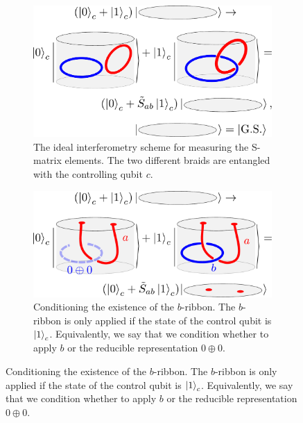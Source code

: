\documentclass[two column]{article}
\begin{document}
\begin{figure}
\centering

\begin{subfigure}{0.47\textwidth}
    \includegraphics[width = \linewidth]{Figures/intef_example.pdf}
    \caption{The ideal interferometry scheme for measuring the S-matrix elements. The two different braids are entangled with the controlling qubit $c$.}
    \label{fig:intef_example}
\end{subfigure}\hfill
\begin{subfigure}{0.47\textwidth}
    \includegraphics[width=\linewidth]{Figures/intefEx.pdf}
    \caption{Conditioning the existence of the $b$-ribbon. The $b$-ribbon is only applied if the state of the control qubit is $\ket{1}_c$. Equivalently, we say that we condition whether to apply $b$ or the reducible representation $0\oplus 0$.}
    \label{fig:cond_ex}
\end{subfigure}


\end{figure}
\end{document}
